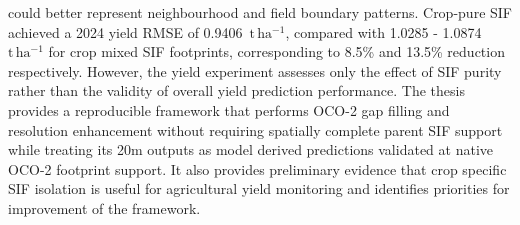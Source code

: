 could better represent neighbourhood and field boundary patterns. Crop-pure SIF achieved a 2024 yield RMSE of 0.9406~$\mathrm{t\,ha^{-1}}$, compared with 1.0285 - 1.0874~$\mathrm{t\,ha^{-1}}$ for crop mixed SIF footprints, corresponding to 8.5\% and 13.5\% reduction respectively. However, the yield experiment assesses only the effect of SIF purity rather than the validity of overall yield prediction performance. The thesis provides a reproducible framework that performs OCO-2 gap filling and resolution enhancement without requiring spatially complete parent SIF support while treating its 20m outputs as model derived predictions validated at native OCO-2 footprint support. It also provides preliminary evidence that crop specific SIF isolation is useful for agricultural yield monitoring and identifies priorities for improvement of the framework. 